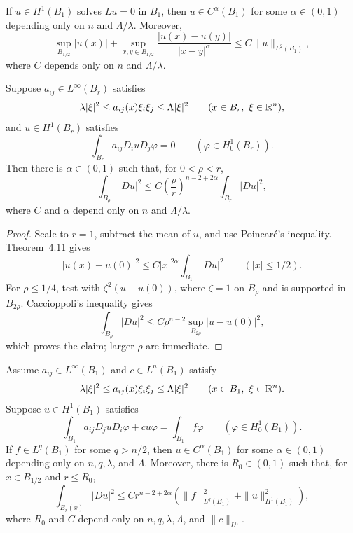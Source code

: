 \begin{theorem}\label{hanlin:weaksol-part2-degiorgi-holder}
If $u\in H^1(B_1)$ solves $Lu=0$ in $B_1$, then
$u\in C^\alpha(B_1)$ for some $\alpha\in(0,1)$ depending only on $n$ and
$\Lambda/\lambda$. Moreover,
\[
\sup_{B_{1/2}}|u(x)|+
\sup_{x,y\in B_{1/2}}\frac{|u(x)-u(y)|}{|x-y|^\alpha}
\leq C\|u\|_{L^2(B_1)},
\]
where $C$ depends only on $n$ and $\Lambda/\lambda$.
\end{theorem}

\begin{lemma}\label{hanlin:weaksol-part2-energy-decay}
Suppose $a_{ij}\in L^\infty(B_r)$ satisfies
\[
\lambda|\xi|^2\leq a_{ij}(x)\xi_i\xi_j\leq\Lambda|\xi|^2
\qquad(x\in B_r,\ \xi\in\mathbb{R}^n),
\]
and $u\in H^1(B_r)$ satisfies
\[
\int_{B_r}a_{ij}D_i uD_j\varphi=0
\qquad(\varphi\in H^1_0(B_r)).
\]
Then there is $\alpha\in(0,1)$ such that, for $0<\rho<r$,
\[
\int_{B_\rho}|Du|^2
\leq C\left(\frac\rho r\right)^{n-2+2\alpha}
\int_{B_r}|Du|^2,
\]
where $C$ and $\alpha$ depend only on $n$ and $\Lambda/\lambda$.
\end{lemma}
\begin{proof}
\sketch Scale to $r=1$, subtract the mean of $u$, and use Poincar\'e's
inequality. Theorem~4.11 gives
\[
|u(x)-u(0)|^2\leq C|x|^{2\alpha}\int_{B_1}|Du|^2
\qquad(|x|\leq1/2).
\]
For $\rho\leq1/4$, test with
$\zeta^2(u-u(0))$, where $\zeta=1$ on $B_\rho$ and is supported in
$B_{2\rho}$. Caccioppoli's inequality gives
\[
\int_{B_\rho}|Du|^2
\leq C\rho^{n-2}\sup_{B_{2\rho}}|u-u(0)|^2,
\]
which proves the claim; larger $\rho$ are immediate.
\end{proof}

\begin{theorem}\label{hanlin:weaksol-part2-general-linear-holder}
Assume $a_{ij}\in L^\infty(B_1)$ and $c\in L^n(B_1)$ satisfy
\[
\lambda|\xi|^2\leq a_{ij}(x)\xi_i\xi_j\leq\Lambda|\xi|^2
\qquad(x\in B_1,\ \xi\in\mathbb{R}^n).
\]
Suppose $u\in H^1(B_1)$ satisfies
\[
\int_{B_1}a_{ij}D_j uD_i\varphi+cu\varphi
=\int_{B_1}f\varphi
\qquad(\varphi\in H^1_0(B_1)).
\]
If $f\in L^q(B_1)$ for some $q>n/2$, then
$u\in C^\alpha(B_1)$ for some $\alpha\in(0,1)$ depending only on
$n,q,\lambda$, and $\Lambda$. Moreover, there is $R_0\in(0,1)$ such
that, for $x\in B_{1/2}$ and $r\leq R_0$,
\[
\int_{B_r(x)}|Du|^2
\leq Cr^{n-2+2\alpha}
\left(\|f\|_{L^q(B_1)}^2+\|u\|_{H^1(B_1)}^2\right),
\]
where $R_0$ and $C$ depend only on
$n,q,\lambda,\Lambda$, and $\|c\|_{L^n}$.
\end{theorem}

